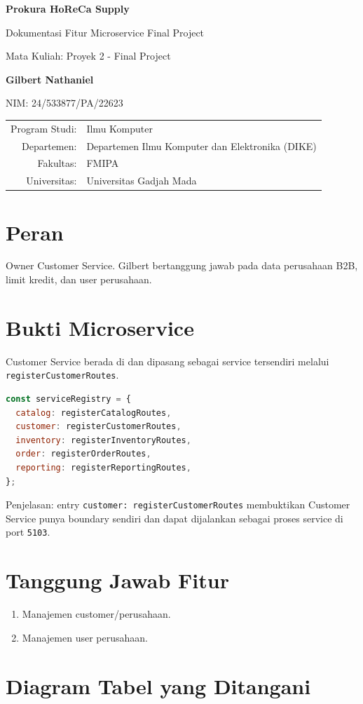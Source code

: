 \documentclass[11pt,a4paper]{article}
\newcommand{\docheader}[2]{
\begin{titlepage}
\centering
{\Large\bfseries Prokura HoReCa Supply\par}
\vspace{0.4cm}
{\large Dokumentasi Fitur Microservice Final Project\par}
\vspace{0.8cm}
{\large Mata Kuliah: Proyek 2 - Final Project\par}
\vspace{1.2cm}
{\large\bfseries #1\par}
{\large NIM: #2\par}
\vfill
\begin{tabular}{rl}
Program Studi: & Ilmu Komputer\\
Departemen: & Departemen Ilmu Komputer dan Elektronika (DIKE)\\
Fakultas: & FMIPA\\
Universitas: & Universitas Gadjah Mada\\
\end{tabular}
\vfill
\end{titlepage}
}
\begin{document}
\docheader{Gilbert Nathaniel}{24/533877/PA/22623}

\section*{Peran}
Owner Customer Service. Gilbert bertanggung jawab pada data perusahaan B2B, limit kredit, dan user perusahaan.

\section*{Bukti Microservice}
Customer Service berada di  dan dipasang sebagai service tersendiri melalui \texttt{registerCustomerRoutes}.

\begin{lstlisting}[language=JavaScript]
const serviceRegistry = {
  catalog: registerCatalogRoutes,
  customer: registerCustomerRoutes,
  inventory: registerInventoryRoutes,
  order: registerOrderRoutes,
  reporting: registerReportingRoutes,
};
\end{lstlisting}

Penjelasan: entry \texttt{customer: registerCustomerRoutes} membuktikan Customer Service punya boundary sendiri dan dapat dijalankan sebagai proses service di port \texttt{5103}.

\section*{Tanggung Jawab Fitur}
\begin{enumerate}
\item Manajemen customer/perusahaan.
\item Manajemen user perusahaan.
\end{enumerate}

\section*{Diagram Tabel yang Ditangani}
\begin{center}
\end{center}
\end{document}
